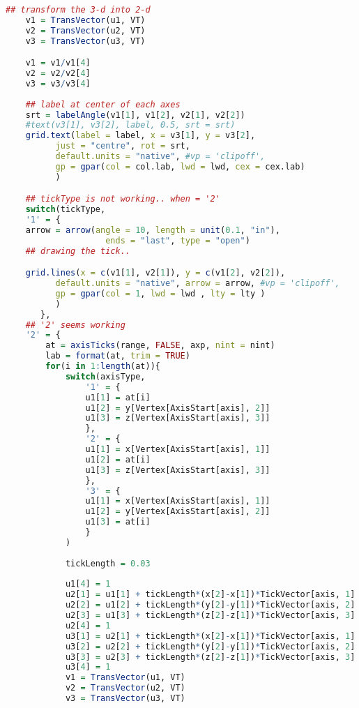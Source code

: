 \begin{lstlisting}[language = R]
    ## transform the 3-d into 2-d
    v1 = TransVector(u1, VT)
    v2 = TransVector(u2, VT)
    v3 = TransVector(u3, VT)

    v1 = v1/v1[4]
    v2 = v2/v2[4]
    v3 = v3/v3[4]
      
    ## label at center of each axes
    srt = labelAngle(v1[1], v1[2], v2[1], v2[2])
    #text(v3[1], v3[2], label, 0.5, srt = srt)
    grid.text(label = label, x = v3[1], y = v3[2],
          just = "centre", rot = srt,
          default.units = "native", #vp = 'clipoff',
          gp = gpar(col = col.lab, lwd = lwd, cex = cex.lab)
          )

    ## tickType is not working.. when = '2'
    switch(tickType,
    '1' = {
    arrow = arrow(angle = 10, length = unit(0.1, "in"),
                    ends = "last", type = "open")  
    ## drawing the tick..

    grid.lines(x = c(v1[1], v2[1]), y = c(v1[2], v2[2]),
          default.units = "native", arrow = arrow, #vp = 'clipoff',
          gp = gpar(col = 1, lwd = lwd , lty = lty )
          )
       },
    ## '2' seems working
    '2' = {
        at = axisTicks(range, FALSE, axp, nint = nint)
        lab = format(at, trim = TRUE)
        for(i in 1:length(at)){
            switch(axisType, 
                '1' = {
                u1[1] = at[i]
                u1[2] = y[Vertex[AxisStart[axis], 2]]
                u1[3] = z[Vertex[AxisStart[axis], 3]]
                },
                '2' = {
                u1[1] = x[Vertex[AxisStart[axis], 1]]
                u1[2] = at[i]
                u1[3] = z[Vertex[AxisStart[axis], 3]]
                },
                '3' = {
                u1[1] = x[Vertex[AxisStart[axis], 1]]
                u1[2] = y[Vertex[AxisStart[axis], 2]]
                u1[3] = at[i]
                }
            )
            
            tickLength = 0.03
            
            u1[4] = 1
            u2[1] = u1[1] + tickLength*(x[2]-x[1])*TickVector[axis, 1]
            u2[2] = u1[2] + tickLength*(y[2]-y[1])*TickVector[axis, 2]
            u2[3] = u1[3] + tickLength*(z[2]-z[1])*TickVector[axis, 3]
            u2[4] = 1
            u3[1] = u2[1] + tickLength*(x[2]-x[1])*TickVector[axis, 1]
            u3[2] = u2[2] + tickLength*(y[2]-y[1])*TickVector[axis, 2]
            u3[3] = u2[3] + tickLength*(z[2]-z[1])*TickVector[axis, 3]
            u3[4] = 1
            v1 = TransVector(u1, VT)
            v2 = TransVector(u2, VT)
            v3 = TransVector(u3, VT)
                        

\end{lstlisting}
